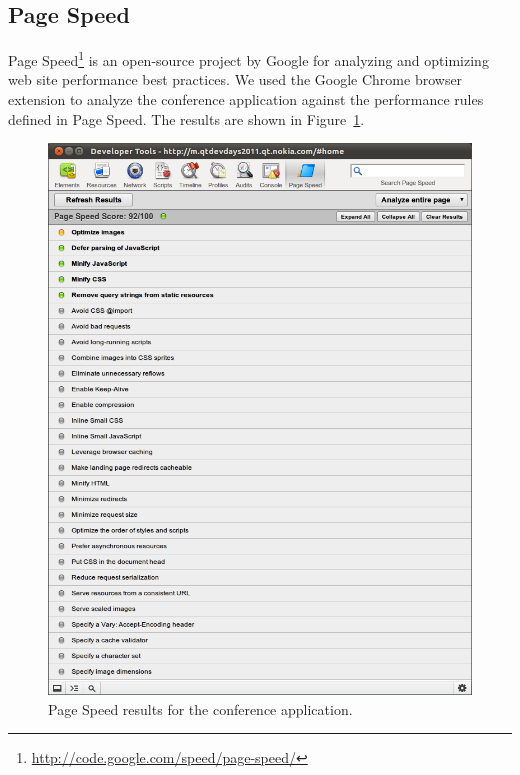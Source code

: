 \subsection{Page Speed}

Page Speed\footnote{\url{http://code.google.com/speed/page-speed/}} is
an open-source project by Google for analyzing and optimizing web site
performance best practices. We used the Google Chrome browser
extension to analyze the conference application against the
performance rules defined in Page Speed. The results are shown in
Figure~\ref{figure:devdays-pagespeed.png}.

\begin{figure}[ht]
  \begin{center}
    \includegraphics[width=\textwidth]{images/devdays-pagespeed.png}
    \caption{Page Speed results for the conference application.}
    \label{figure:devdays-pagespeed.png}
  \end{center}
\end{figure}

